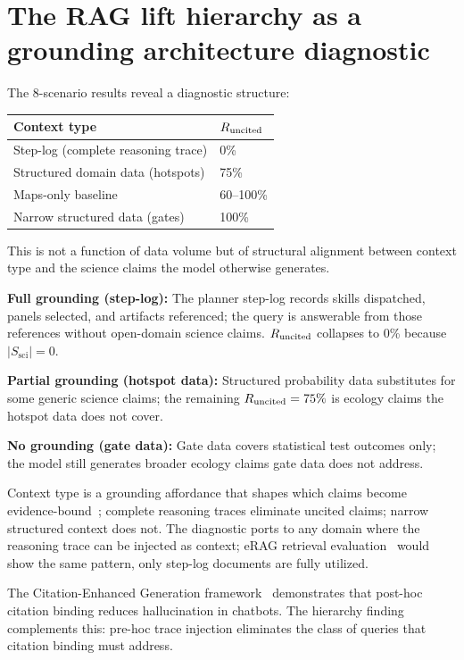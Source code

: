 \section{The RAG lift hierarchy as a grounding architecture diagnostic}

The 8-scenario results reveal a diagnostic structure:

\begin{center}
\small
\begin{tabular}{@{}ll@{}}
\toprule
Context type & $R_{\mathrm{uncited}}$ \\
\midrule
Step-log (complete reasoning trace) & 0\% \\
Structured domain data (hotspots) & 75\% \\
Maps-only baseline & 60--100\% \\
Narrow structured data (gates) & 100\% \\
\bottomrule
\end{tabular}
\end{center}

This is not a function of data volume but of structural alignment between context type and the science
claims the model otherwise generates.

\textbf{Full grounding (step-log):} The planner step-log records skills dispatched, panels selected,
and artifacts referenced; the query is answerable from those references without open-domain science
claims. $R_{\mathrm{uncited}}$ collapses to 0\% because $|S_\mathrm{sci}| = 0$.

\textbf{Partial grounding (hotspot data):} Structured probability data substitutes for some generic
science claims; the remaining $R_{\mathrm{uncited}} = 75\%$ is ecology claims the hotspot data does not cover.

\textbf{No grounding (gate data):} Gate data covers statistical test outcomes only; the model still
generates broader ecology claims gate data does not address.

Context type is a grounding affordance that shapes which claims become evidence-bound~\cite{davis2023affordances};
complete reasoning traces eliminate uncited claims; narrow structured context does not. The diagnostic
ports to any domain where the reasoning trace can be injected as context; eRAG retrieval
evaluation~\cite{arxiv240413781} would show the same pattern, only step-log documents are fully utilized.

The Citation-Enhanced Generation framework~\cite{arxiv240216063} demonstrates that post-hoc citation
binding reduces hallucination in chatbots. The hierarchy finding complements this: pre-hoc trace
injection eliminates the class of queries that citation binding must address.
